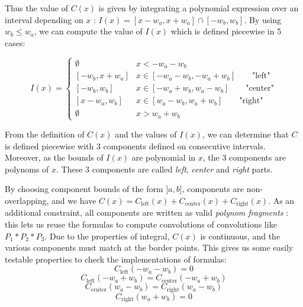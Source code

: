 \documentclass[a4paper,10pt]{article}
\newcommand\Convolution{\ast}
\begin{document}
Thus the value of $C(x)$ is given by integrating a polynomial expression over an interval depending on $x$ : $I(x) = [x-w_a,x+w_a] \cap [-w_b,w_b]$.
By using $w_b \le w_a$, we can compute the value of $I(x)$ which is defined piecewise in 5 cases:
\begin{center}\end{center}
\[ I(x) = \begin{cases}
    \emptyset & x < -w_a-w_b \\
    [-w_b, x+w_a] & x \in [-w_a-w_b, -w_a+w_b] \qquad \text{"left"} \\
    [-w_b, w_b] & x \in [-w_a+w_b, w_a-w_b] \qquad \text{"center"} \\
    [x-w_a, w_b] & x \in [w_a-w_b, w_a+w_b] \qquad \text{"right"} \\
    \emptyset & x > w_a + w_b
\end{cases} \]

From the definition of $C(x)$ and the values of $I(x)$, we can determine that $C$ is defined piecewise with 3 components defined on consecutive intervals.
Moreover, as the bounds of $I(x)$ are polynomial in $x$, the 3 components are polynoms of $x$.
These 3 components are called \emph{left}, \emph{center} and \emph{right} parts.

By choosing component bounds of the form $]a,b]$, components are non-overlapping, and we have $C(x) = C_\text{left}(x) + C_\text{center}(x) + C_\text{right}(x)$.
As an additional constraint, all components are written as valid \emph{polynom fragments} : this lets us reuse the formulas to compute convolutions of convolutions like $P_1 \Convolution P_2 \Convolution P_3$.
Due to the properties of integral, $C(x)$ is continuous, and the various components must match at the border points.
This gives us some easily testable properties to check the implementations of formulas:
\[ C_\text{left}(-w_a-w_b) = 0 \]
\[ C_\text{left}(-w_a+w_b) = C_\text{center}(-w_a+w_b) \]
\[ C_\text{center}(w_a-w_b) = C_\text{right}(w_a-w_b) \]
\[ C_\text{right}(w_a+w_b) = 0 \]
\end{document}
